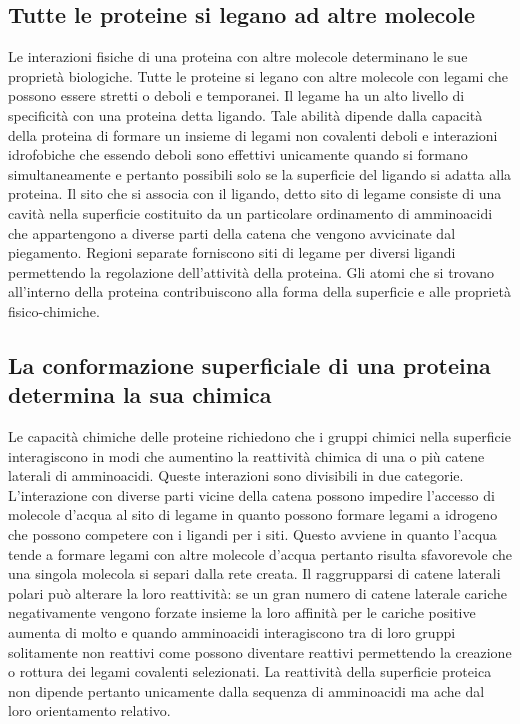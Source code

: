 \subsection{Tutte le proteine si legano ad altre molecole}
Le interazioni fisiche di una proteina con altre molecole determinano le sue propriet\`a biologiche. Tutte le proteine si legano con altre molecole con legami che possono essere stretti
o deboli e temporanei. Il legame ha un alto livello di specificit\`a con una proteina detta ligando. Tale abilit\`a dipende dalla capacit\`a della proteina di formare un insieme di 
legami non covalenti deboli e interazioni idrofobiche che essendo deboli sono effettivi unicamente quando si formano simultaneamente e pertanto possibili solo se la superficie del 
ligando si adatta alla proteina. Il sito che si associa con il ligando, detto sito di legame consiste di una cavit\`a nella superficie costituito da un particolare ordinamento di 
amminoacidi che appartengono a diverse parti della catena che vengono avvicinate dal piegamento. Regioni separate forniscono siti di legame per diversi ligandi permettendo la regolazione
dell'attivit\`a della proteina. Gli atomi che si trovano all'interno della proteina contribuiscono alla forma della superficie e alle propriet\`a fisico-chimiche. 
\subsection{La conformazione superficiale di una proteina determina la sua chimica}
Le capacit\`a chimiche delle proteine richiedono che i gruppi chimici nella superficie interagiscono in modi che aumentino la reattivit\`a chimica di una o pi\`u catene laterali di 
amminoacidi. Queste interazioni sono divisibili in due categorie. L'interazione con diverse parti vicine della catena possono impedire l'accesso di molecole d'acqua al sito di legame in
quanto possono formare legami a idrogeno che possono competere con i ligandi per i siti. Questo avviene in quanto l'acqua tende a formare legami con altre molecole d'acqua pertanto 
risulta sfavorevole che una singola molecola si separi dalla rete creata. Il raggrupparsi di catene laterali polari pu\`o alterare la loro reattivit\`a: se un gran numero di catene
laterale cariche negativamente vengono forzate insieme la loro affinit\`a per le cariche positive aumenta di molto e quando amminoacidi interagiscono tra di loro gruppi solitamente 
non reattivi come  possono diventare reattivi permettendo la creazione o rottura dei legami covalenti selezionati. La reattivit\`a della superficie proteica non dipende 
pertanto unicamente dalla sequenza di amminoacidi ma ache dal loro orientamento relativo. 
